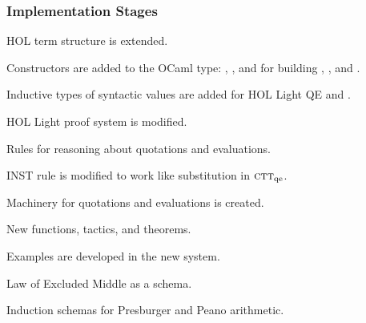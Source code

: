 \documentclass[t,12pt,numbers,fleqn]{beamer}
\newcommand{\churchqe}{$\mbox{\sc ctt}_{\rm qe}$}
\begin{document}
\begin{frame}
\frametitle{Implementation Stages}
\be

  \item HOL term structure is extended.

  \bi

    \item Constructors are added to the OCaml type: ,
      , and  for building ,
      , and .

    \item Inductive types of syntactic values are added for HOL Light
      QE  and .

  \ei

  \item HOL Light proof system is modified.

  \bi

    \item Rules for reasoning about quotations and evaluations.

    \item INST rule is modified to work like substitution in
      {\churchqe}.

  \ei

  \item Machinery for quotations and evaluations is created.

  \bi

    \item New functions, tactics, and theorems.

  \ei

  \item Examples are developed in the new system.

  \bi

    \item Law of Excluded Middle as a schema.

    \item Induction schemas for Presburger and Peano arithmetic.

  \ei

\ee
\end{frame}

\end{document}
